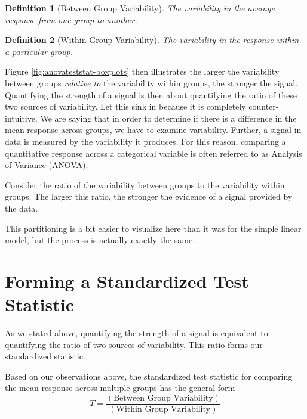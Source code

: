 \documentclass[
]{book}
\theoremstyle{plain}
\theoremstyle{mydefn}
\newtheorem{definition}{Definition}[chapter]
\theoremstyle{myexmpl}
\theoremstyle{remark}
\begin{document}
\begin{definition}[Between Group Variability]
\protect\hypertarget{def:defn-between-group-variability}{}{\label{def:defn-between-group-variability} {} }The variability in the average response from one group to another.
\end{definition}

\begin{definition}[Within Group Variability]
\protect\hypertarget{def:defn-within-group-variability}{}{\label{def:defn-within-group-variability} {} }The variability in the response within a particular group.
\end{definition}

Figure \ref{fig:anovateststat-boxplots} then illustrates the larger the variability between groups \emph{relative to} the variability within groups, the stronger the signal. Quantifying the strength of a signal is then about quantifying the ratio of these two sources of variability. Let this sink in because it is completely counter-intuitive. We are saying that in order to determine if there is a difference in the mean response across groups, we have to examine variability. Further, a signal in data is measured by the variability it produces. For this reason, comparing a quantitative response across a categorical variable is often referred to as Analysis of Variance (ANOVA).

\begin{rmdkeyidea}
Consider the ratio of the variability between groups to the variability within groups. The larger this ratio, the stronger the evidence of a signal provided by the data.
\end{rmdkeyidea}

This partitioning is a bit easier to visualize here than it was for the simple linear model, but the process is actually exactly the same.

\hypertarget{forming-a-standardized-test-statistic}{%
\section{Forming a Standardized Test Statistic}\label{forming-a-standardized-test-statistic}}

As we stated above, quantifying the strength of a signal is equivalent to quantifying the ratio of two sources of variability. This ratio forms our standardized statistic.

Based on our observations above, the standardized test statistic for comparing the mean response across multiple groups has the general form
\begin{equation}
  T = \frac{(\text{Between Group Variability})}{(\text{Within Group Variability})}
  \label{eq:general-test-stat}
\end{equation}
\end{document}
